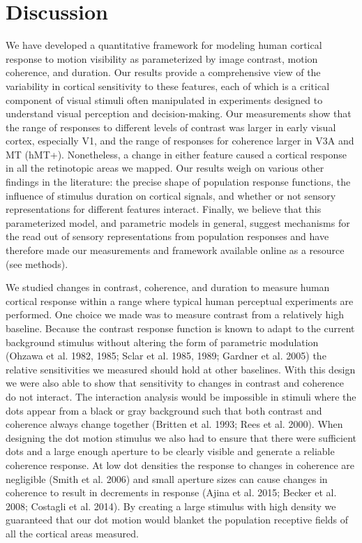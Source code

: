 \section{Discussion}

We have developed a quantitative framework for modeling human cortical response to motion visibility as parameterized by image contrast, motion coherence, and duration. Our results provide a comprehensive view of the variability in cortical sensitivity to these features, each of which is a critical component of visual stimuli often manipulated in experiments designed to understand visual perception and decision-making. Our measurements show that the range of responses to different levels of contrast was larger in early visual cortex, especially V1, and the range of responses for coherence larger in V3A and MT (hMT+). Nonetheless, a change in either feature caused a cortical response in all the retinotopic areas we mapped. Our results weigh on various other findings in the literature: the precise shape of population response functions, the influence of stimulus duration on cortical signals, and whether or not sensory representations for different features interact. Finally, we believe that this parameterized model, and parametric models in general, suggest mechanisms for the read out of sensory representations from population responses and have therefore made our measurements and framework available online as a resource (see methods).

We studied changes in contrast, coherence, and duration to measure human cortical response within a range where typical human perceptual experiments are performed. One choice we made was to measure contrast from a relatively high baseline. Because the contrast response function is known to adapt to the current background stimulus without altering the form of parametric modulation (Ohzawa et al. 1982, 1985; Sclar et al. 1985, 1989; Gardner et al. 2005) the relative sensitivities we measured should hold at other baselines. With this design we were also able to show that sensitivity to changes in contrast and coherence do not interact. The interaction analysis would be impossible in stimuli where the dots appear from a black or gray background such that both contrast and coherence always change together (Britten et al. 1993; Rees et al. 2000). When designing the dot motion stimulus we also had to ensure that there were sufficient dots and a large enough aperture to be clearly visible and generate a reliable coherence response. At low dot densities the response to changes in coherence are negligible (Smith et al. 2006) and small aperture sizes can cause changes in coherence to result in decrements in response (Ajina et al. 2015; Becker et al. 2008; Costagli et al. 2014). By creating a large stimulus with high density we guaranteed that our dot motion would blanket the population receptive fields of all the cortical areas measured.

